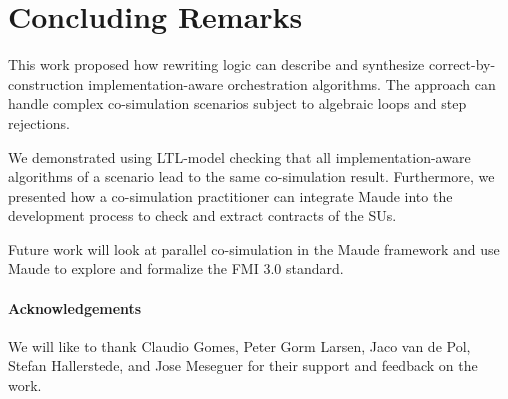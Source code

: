 \section{Concluding Remarks}\label{sc:summary}
This work proposed how rewriting logic can describe and synthesize correct-by-construction implementation-aware orchestration algorithms.
The approach can handle complex co-simulation scenarios subject to algebraic loops and step rejections.

We demonstrated using LTL-model checking that all implementation-aware algorithms of a scenario lead to the same co-simulation result.
Furthermore, we presented how a co-simulation practitioner can integrate Maude into the development process to check and extract contracts of the SUs.

Future work will look at parallel co-simulation in the Maude framework and use Maude to explore and formalize the FMI 3.0 standard.

\paragraph{Acknowledgements}
We will like to thank Claudio Gomes, Peter Gorm Larsen, Jaco van de Pol, Stefan Hallerstede, and Jose Meseguer for their support and feedback on the work.